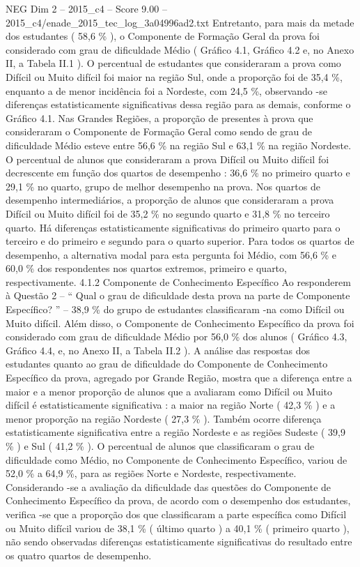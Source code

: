 \begin{textsample}{NEG Dim 2 – 2015\_c4 – Score 9.00 – 2015\_c4/enade\_2015\_tec\_log\_3a04996ad2.txt}
Entretanto, para mais da metade dos estudantes ( 58,6 \% ), o Componente de Formação Geral da prova foi considerado com grau de dificuldade Médio ( Gráfico 4.1, Gráfico 4.2 e, no Anexo II, a Tabela II.1 ).
O percentual de estudantes que consideraram a prova como Difícil ou Muito difícil foi maior na região Sul, onde a proporção foi de 35,4 \%, enquanto a de menor incidência foi a Nordeste, com 24,5 \%, observando -se diferenças estatisticamente significativas dessa região para as demais, conforme o Gráfico 4.1.
Nas Grandes Regiões, a proporção de presentes à prova que consideraram o Componente de Formação Geral como sendo de grau de dificuldade Médio esteve entre 56,6 \% na região Sul e 63,1 \% na região Nordeste.
O percentual de alunos que consideraram a prova Difícil ou Muito difícil foi decrescente em função dos quartos de desempenho : 36,6 \% no primeiro quarto e 29,1 \% no quarto, grupo de melhor desempenho na prova.
Nos quartos de desempenho intermediários, a proporção de alunos que consideraram a prova Difícil ou Muito difícil foi de 35,2 \% no segundo quarto e 31,8 \% no terceiro quarto.
Há diferenças estatisticamente significativas do primeiro quarto para o terceiro e do primeiro e segundo para o quarto superior.
Para todos os quartos de desempenho, a alternativa modal para esta pergunta foi Médio, com 56,6 \% e 60,0 \% dos respondentes nos quartos extremos, primeiro e quarto, respectivamente. 4.1.2 Componente de Conhecimento Específico Ao responderem à Questão 2 – “ Qual o grau de dificuldade desta prova na parte de Componente Específico? ” – 38,9 \% do grupo de estudantes classificaram -na como Difícil ou Muito difícil.
Além disso, o Componente de Conhecimento Específico da prova foi considerado com grau de dificuldade Médio por 56,0 \% dos alunos ( Gráfico 4.3, Gráfico 4.4, e, no Anexo II, a Tabela II.2 ).
A análise das respostas dos estudantes quanto ao grau de dificuldade do Componente de Conhecimento Específico da prova, agregado por Grande Região, mostra que a diferença entre a maior e a menor proporção de alunos que a avaliaram como Difícil ou Muito difícil é estatisticamente significativa : a maior na região Norte ( 42,3 \% ) e a menor proporção na região Nordeste ( 27,3 \% ).
Também ocorre diferença estatisticamente significativa entre a região Nordeste e as regiões Sudeste ( 39,9 \% ) e Sul ( 41,2 \% ).
O percentual de alunos que classificaram o grau de dificuldade como Médio, no Componente de Conhecimento Específico, variou de 52,0 \% a 64,9 \%, para as regiões Norte e Nordeste, respectivamente.
Considerando -se a avaliação da dificuldade das questões do Componente de Conhecimento Específico da prova, de acordo com o desempenho dos estudantes, verifica -se que a proporção dos que classificaram a parte específica como Difícil ou Muito difícil variou de 38,1 \% ( último quarto ) a 40,1 \% ( primeiro quarto ), não sendo observadas diferenças estatisticamente significativas do resultado entre os quatro quartos de desempenho.

\end{textsample}
